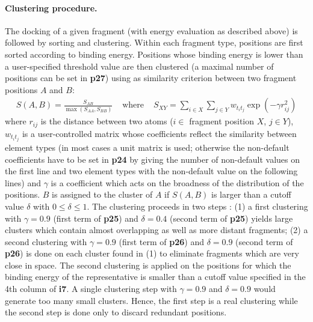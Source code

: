 \documentclass[a4paper,12pt,titlepage]{article}
\begin{document}
\paragraph{Clustering procedure.}
\label{par:Clustering}

The docking of a given fragment (with energy evaluation as 
described above) is followed by sorting and clustering.  Within each fragment type, 
positions are first sorted according to binding energy.  Positions
whose binding energy is lower than a user-specified threshold value are
then clustered (a maximal number of positions can be set in {\bf p27}) using as similarity criterion 
between two fragment positions $A$ and $B$: 
\begin{eqnarray}
S(A,B)=\frac{S_{AB}}{\max (S_{AA},S_{BB})} & \mbox{ where } & 
    S_{XY}=\sum_{i \in X} \sum_{j \in Y} w_{t_i t_j} \exp (- \gamma r^2_{ij})
\end{eqnarray}
where
$r_{ij}$ is the distance between two atoms ($i \in$ fragment position $X$, 
$j \in Y$), $w_{t_i t_j}$ is a user-controlled matrix whose coefficients 
reflect the similarity between element types (in most cases a unit matrix is used; 
otherwise the non-default coefficients have to be set in {\bf p24} by giving the number of non-default 
values on the first line and two element types with the non-default value on the following lines) 
and $\gamma$ is a coefficient which acts on the broadness of the distribution
of the positions.  $B$ is assigned to the cluster of 
$A$ if $S(A,B)$ is larger than a cutoff value $\delta$ with $0 \leq \delta \leq 
1$. 
The clustering proceeds in two steps :
(1) a first clustering with $\gamma=0.9$ (first term of {\bf p25}) and $\delta=0.4$ 
(second term of {\bf p25}) yields 
large clusters which contain almost overlapping as well as more distant fragments; 
(2) a second clustering with $\gamma=0.9$ (first term of {\bf p26}) and $\delta=0.9$ 
(second term of {\bf p26}) is done on each 
cluster found in (1) to eliminate fragments which are very close in space. 
The second clustering is applied on the positions for which the binding energy of the representative 
is smaller than a cutoff value specified in the 4th column of {\bf i7}. 
A single clustering step with $\gamma=0.9$ and $\delta=0.9$ would generate 
too many small clusters. Hence, the first step is a real clustering while the 
second step is done only to discard redundant positions. 
\end{document}
